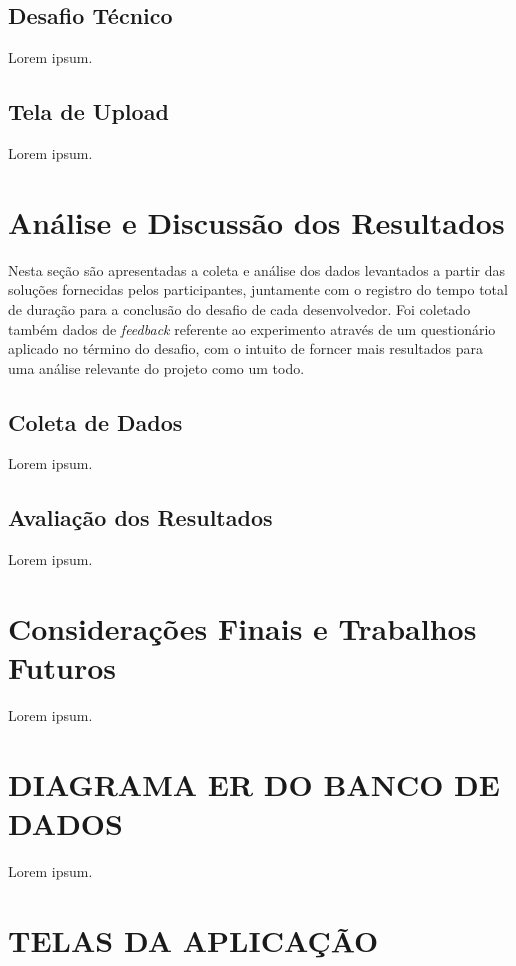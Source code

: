 \documentclass[english,brazilian]{UNISINOSartigo} %
\begin{document}
\subsection{Desafio Técnico}

Lorem ipsum.

\subsection{Tela de Upload}

Lorem ipsum.

\section{Análise e Discussão dos Resultados}

Nesta seção são apresentadas a coleta e análise dos dados levantados a partir das soluções fornecidas pelos participantes, juntamente com o registro do tempo total de duração para a conclusão do desafio de cada desenvolvedor. Foi coletado também dados de \textit{feedback} referente ao experimento através de um questionário aplicado no término do desafio, com o intuito de forncer mais resultados para uma análise relevante do projeto como um todo.

\subsection{Coleta de Dados}

Lorem ipsum.

\subsection{Avaliação dos Resultados}

Lorem ipsum.

\section{Considerações Finais e Trabalhos Futuros}

Lorem ipsum.



\appendix
\section{DIAGRAMA ER DO BANCO DE DADOS}

Lorem ipsum.

\section{TELAS DA APLICAÇÃO}
\label{sec:telas_da_aplicacao}
\end{document}
